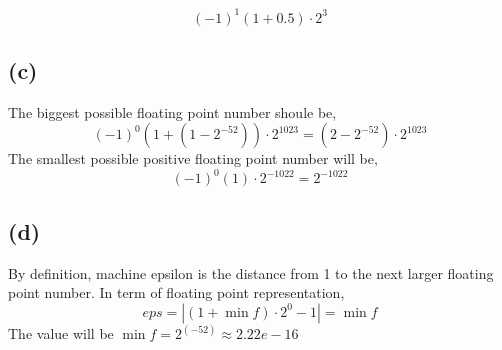 \documentclass{article}
\begin{document}
$$(-1)^1(1+0.5)\cdot 2^{3}$$


\subsection*{(c)}
The biggest possible floating point number shoule be,
$$(-1)^0(1+(1-2^{-52})) \cdot 2^{1023} = (2-2^{-52})\cdot 2^{1023}$$
The smallest possible positive floating point number will be,
$$(-1)^0 (1)\cdot 2^{-1022} = 2^{-1022}$$


\subsection*{(d)}
By definition, machine epsilon is the distance from 1 to the next larger floating point number.
In term of floating point representation,
$$eps = |(1+\min f) \cdot 2^0 - 1 |= \min f$$
The value will be $\min  f = 2^(-52) \approx 2.22e-16$
\end{document}
